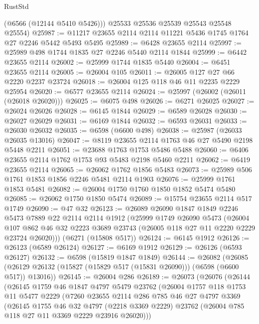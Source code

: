 \begin{lexlean}{RustStd}
\begin{coremodule}
{\begin{coremodule}
{{{{{{{{{{{{{{{{{{{{{{{{{{        (@6566 (@12144 @5410 @5426)))
      @25533
      @25536
      @25539
      @25543
      @25548
      @25554)
@25987 := @11217 @23655 @2114 @2114 @11221 @5436 @1745 @1764 @27 @2246 @5442 @5493 @5495
@25989 := @6428 @23655 @2114
@25997 := @25989 @498 @1744 @1835 @27 @2246 @5440 @2114 @1844
@25999 := @6442 @23655 @2114
@26002 := @25999 @1744 @1835 @5440
@26004 := @6451 @23655 @2114
@26005 := @26004 @105
@26011 := @26005 @127 @27 @66 @2220 @2237 @23724
@26018 := @26004 @125 @118 @46 @11 @2235 @2229 @25954
@26020 := @6577 @23655 @2114
@26024 := @25997 (@26002 (@26011 (@26018 @26020)))
@26025 := @6075 @498
@26026 := @6271 @26025
@26027 := @26024 @26026
@26028 := @6145 @1844
@26029 := @6589 @26028
@26030 := @26027 @26029
@26031 := @6169 @1844
@26032 := @6593 @26031
@26033 := @26030 @26032
@26035 := @6598 (@6600 @498)
@26038 := @25987 (@26033 @26035 @13016)
@26047 := @8119 @23655 @2114 @1763 @46 @27 @5490 @2198 @5448 @2211
@26051 := @23688 @1763 @1753 @5486 @5488
@26060 := @6406 @23655 @2114 @1762 @1753 @93 @5483 @2198 @5460 @2211
@26062 := @6419 @23655 @2114
@26065 := @26062 @1762 @1856 @5483
@26073 := @25989 @506 @1761 @1853 @1856 @2246 @5481 @2114 @1903
@26076 := @25999 @1761 @1853 @5481
@26082 := @26004 @1750 @1760 @1850 @1852 @5474 @5480
@26085 := @26062 @1750 @1850 @5474
@26089 := @15754 @23655 @2114 @517 @1749
@26090 := @47 @32
@26123 := @26089
    @26090
    @1847
    @1849
    @2246
    @5473
    @7889
    @22
    @2114
    @2114
    @1912
    (@25999
      @1749
      @26090
      @5473
      (@26004 @107 @862 @46 @32 @2223 @3689 @23743 (@26005 @118 @27 @11 @2220 @2229 @23724 @26020)))
    (@6271 (@15808 @517))
@26124 := @6145 @1912
@26126 := @26123 (@6589 @26124)
@26127 := @6169 @1912
@26129 := @26126 (@6593 @26127)
@26132 := @6598 (@15819 @1847 @1849)
@26144 := @26082
    (@26085 (@26129 @26132 (@15827 (@15829 @517 (@15831 @26090))) (@6598 (@6600 @517)) @13016))
@26145 := @26004 @286
@26189 := @26073
    (@26076
      (@26144
        (@26145
          @1759
          @46
          @1847
          @4797
          @5479
          @23762
          (@26004
            @1757
            @118
            @1753
            @11
            @5477
            @2229
            (@7260
              @23655
              @2114
              @286
              @785
              @46
              @27
              @4797
              @3369
              (@26145
                @1755
                @46
                @32
                @4797
                (@2218 @3369 @2229)
                @23762
                (@26004 @785 @118 @27 @11 @3369 @2229 @23916 @26020)))
}}}}}}}}}}}}}}}}}}}}}}}}}}
\end{coremodule}}
\end{coremodule}
\end{lexlean}
